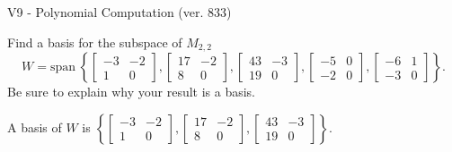 \begin{exercise}
  \begin{exerciseTitle}V9 - Polynomial Computation (ver. 833)\end{exerciseTitle}
  \begin{exerciseStatement}
    Find a basis for the subspace of \(M_{2,2}\) 
\[W=\mathrm{span}\ \left\{\left[\begin{array}{cc}
-3 & -2 \\
1 & 0
\end{array}\right] , \left[\begin{array}{cc}
17 & -2 \\
8 & 0
\end{array}\right] , \left[\begin{array}{cc}
43 & -3 \\
19 & 0
\end{array}\right] , \left[\begin{array}{cc}
-5 & 0 \\
-2 & 0
\end{array}\right] , \left[\begin{array}{cc}
-6 & 1 \\
-3 & 0
\end{array}\right]\right\}.\]
 Be sure to explain why your result is a basis.


  \end{exerciseStatement}
  \begin{exerciseAnswer}
   A basis of \(W\) is  \(\left\{\left[\begin{array}{cc}
-3 & -2 \\
1 & 0
\end{array}\right] , \left[\begin{array}{cc}
17 & -2 \\
8 & 0
\end{array}\right] , \left[\begin{array}{cc}
43 & -3 \\
19 & 0
\end{array}\right]\right\}\).
  


  \end{exerciseAnswer}
\end{exercise}